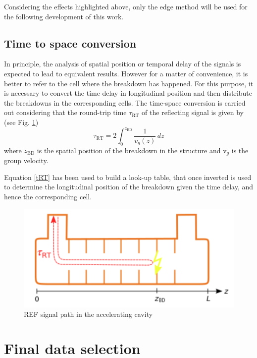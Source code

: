 \noindent
Considering the effects highlighted above, only the edge method will be used for the following development of this work.



\subsection[Time to space conversion]{Time to space conversion}

In principle, the analysis of spatial position or temporal delay of the signals is expected to lead to equivalent results. However for a matter of convenience, it is better to refer to the cell where the breakdown has happened. For this purpose, it is necessary to convert the time delay in longitudinal position and then distribute the breakdowns in the corresponding cells. The time-space conversion is carried out considering that the round-trip time $\tau_{\text{RT}}$  of the reflecting signal is given by (see Fig. \ref{tToz_p})
\begin{equation}
\tau_{\text{RT}} = 2 \int_0^{z_{\text{BD}}} \frac{1}{v_g (z)} \, dz
\label{tRT}
\end{equation}
where $z_{\text{BD}}$ is the spatial position of the breakdown in the structure and v$_g$ is the group velocity.

Equation \ref{tRT} has been used to build a look-up table, that once inverted is used to determine the longitudinal position of the breakdown given the time delay, and hence the corresponding cell.


\begin{figure}[h]
\centering 
\includegraphics[scale=0.3]{pictures/tToz}
\caption{REF signal path in the accelerating cavity}
\label{tToz_p}
\end{figure}




\section[Final data selection]{Final data selection}
\label{sec:BDR}

